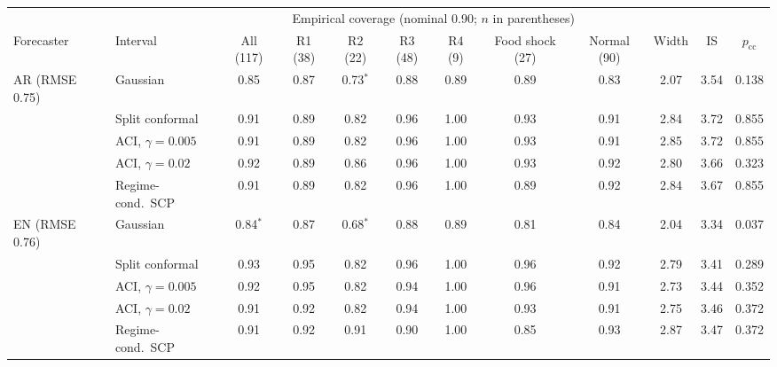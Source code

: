 \begin{tabular}{llcccccccccc}
\toprule
 & & \multicolumn{7}{c}{Empirical coverage (nominal 0.90; $n$ in parentheses)} & & & \\
\cmidrule(lr){3-9}
Forecaster & Interval & All (117) & R1 (38) & R2 (22) & R3 (48) & R4 (9) & Food shock (27) & Normal (90) & Width & IS & $p_{\mathrm{cc}}$ \\
\midrule
AR (RMSE 0.75) & Gaussian & 0.85 & 0.87 & 0.73$^{*}$ & 0.88 & 0.89 & 0.89 & 0.83 & 2.07 & 3.54 & 0.138 \\
 & Split conformal & 0.91 & 0.89 & 0.82 & 0.96 & 1.00 & 0.93 & 0.91 & 2.84 & 3.72 & 0.855 \\
 & ACI, $\gamma=0.005$ & 0.91 & 0.89 & 0.82 & 0.96 & 1.00 & 0.93 & 0.91 & 2.85 & 3.72 & 0.855 \\
 & ACI, $\gamma=0.02$ & 0.92 & 0.89 & 0.86 & 0.96 & 1.00 & 0.93 & 0.92 & 2.80 & 3.66 & 0.323 \\
 & Regime-cond.\ SCP & 0.91 & 0.89 & 0.82 & 0.96 & 1.00 & 0.89 & 0.92 & 2.84 & 3.67 & 0.855 \\
\midrule
EN (RMSE 0.76) & Gaussian & 0.84$^{*}$ & 0.87 & 0.68$^{*}$ & 0.88 & 0.89 & 0.81 & 0.84 & 2.04 & 3.34 & 0.037 \\
 & Split conformal & 0.93 & 0.95 & 0.82 & 0.96 & 1.00 & 0.96 & 0.92 & 2.79 & 3.41 & 0.289 \\
 & ACI, $\gamma=0.005$ & 0.92 & 0.95 & 0.82 & 0.94 & 1.00 & 0.96 & 0.91 & 2.73 & 3.44 & 0.352 \\
 & ACI, $\gamma=0.02$ & 0.91 & 0.92 & 0.82 & 0.94 & 1.00 & 0.93 & 0.91 & 2.75 & 3.46 & 0.372 \\
 & Regime-cond.\ SCP & 0.91 & 0.92 & 0.91 & 0.90 & 1.00 & 0.85 & 0.93 & 2.87 & 3.47 & 0.372 \\
\bottomrule
\end{tabular}

